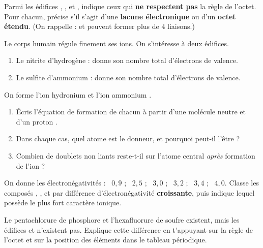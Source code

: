 \documentclass[11pt,a4paper]{article}
\begin{document}
\begin{exo}
Parmi les édifices , ,  et , indique ceux qui
\textbf{ne respectent pas} la règle de l'octet. Pour chacun, précise s'il s'agit d'une
\textbf{lacune électronique} ou d'un \textbf{octet étendu}. (On rappelle :  et 
peuvent former plus de $4$ liaisons.)
\end{exo}

\begin{exo}
Le corps humain régule finement ses ions. On s'intéresse à deux édifices.
\begin{enumerate}[label=\alph*)]
  \item Le nitrite d'hydrogène  : donne son nombre total d'électrons de valence.
  \item Le sulfite d'ammonium  : donne son nombre total d'électrons de valence.
\end{enumerate}
\end{exo}

\begin{exo}
On forme l'ion hydronium  et l'ion ammonium .
\begin{enumerate}[label=\alph*)]
  \item Écris l'équation de formation de chacun à partir d'une molécule neutre et d'un proton
        .
  \item Dans chaque cas, quel atome est le donneur, et pourquoi peut-il l'être ?
  \item Combien de doublets non liants reste-t-il sur l'atome central \emph{après} formation de
        l'ion ?
\end{enumerate}
\end{exo}

\begin{exo}
On donne les électronégativités : ~$0{,}9$ ; ~$2{,}5$ ; ~$3{,}0$ ;
~$3{,}2$ ; ~$3{,}4$ ; ~$4{,}0$. Classe les composés , ,
 et  par différence d'électronégativité \textbf{croissante}, puis indique lequel
possède le plus fort caractère ionique.
\end{exo}

\begin{exo}
Le pentachlorure de phosphore  et l'hexafluorure de soufre  existent, mais les
édifices  et  n'existent pas. Explique cette différence en t'appuyant sur la
règle de l'octet et sur la position des éléments dans le tableau périodique.
\end{exo}
\end{document}

